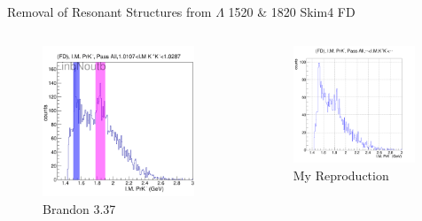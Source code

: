 \documentclass[aspectratio=169]{beamer}
\begin{document}
\begin{frame}{Removal of Resonant Structures from $\Lambda$ 1520 \& 1820  \hfill Skim4 FD}
\vspace*{-0.6cm}
    \begin{columns}
    \begin{figure}
        \centering
        \includegraphics[width=0.94\textwidth]{brandon_figs/37.png}
        \caption{Brandon 3.37}
    \end{figure}
    \begin{figure}
        \centering
        \includegraphics[width=0.97\textwidth]{pdfs/37.png}
        \caption{My Reproduction}
    \end{figure}
    \end{columns}
\end{frame}
\end{document}
